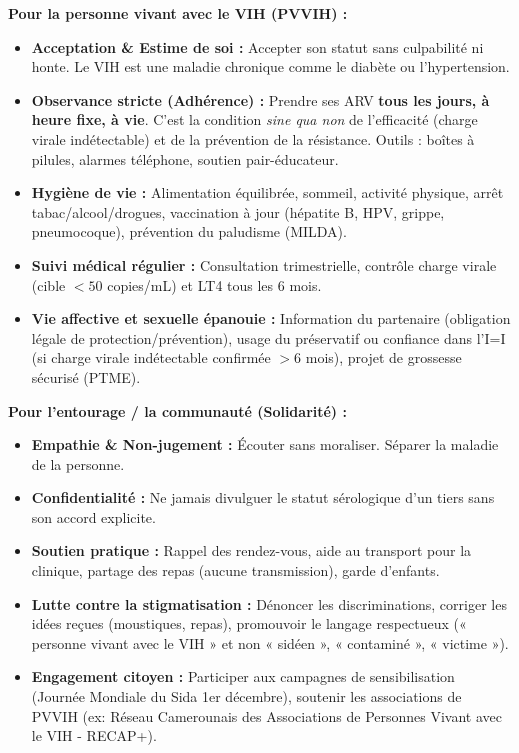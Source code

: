 \documentclass[11pt]{article}
\begin{document}
\begin{aretenir}
\textbf{Pour la personne vivant avec le VIH (PVVIH) :}
\begin{itemize}
    \item \textbf{Acceptation \& Estime de soi :} Accepter son statut sans culpabilité ni honte. Le VIH est une maladie chronique comme le diabète ou l'hypertension.
    \item \textbf{Observance stricte (Adhérence) :} Prendre ses ARV \textbf{tous les jours, à heure fixe, à vie}. C'est la condition \textit{sine qua non} de l'efficacité (charge virale indétectable) et de la prévention de la résistance. Outils : boîtes à pilules, alarmes téléphone, soutien pair-éducateur.
    \item \textbf{Hygiène de vie :} Alimentation équilibrée, sommeil, activité physique, arrêt tabac/alcool/drogues, vaccination à jour (hépatite B, HPV, grippe, pneumocoque), prévention du paludisme (MILDA).
    \item \textbf{Suivi médical régulier :} Consultation trimestrielle, contrôle charge virale (cible $< 50$ copies/mL) et LT4 tous les 6 mois.
    \item \textbf{Vie affective et sexuelle épanouie :} Information du partenaire (obligation légale de protection/prévention), usage du préservatif ou confiance dans l'I=I (si charge virale indétectable confirmée $> 6$ mois), projet de grossesse sécurisé (PTME).
\end{itemize}

\textbf{Pour l'entourage / la communauté (Solidarité) :}
\begin{itemize}
    \item \textbf{Empathie \& Non-jugement :} Écouter sans moraliser. Séparer la maladie de la personne.
    \item \textbf{Confidentialité :} Ne jamais divulguer le statut sérologique d'un tiers sans son accord explicite.
    \item \textbf{Soutien pratique :} Rappel des rendez-vous, aide au transport pour la clinique, partage des repas (aucune transmission), garde d'enfants.
    \item \textbf{Lutte contre la stigmatisation :} Dénoncer les discriminations, corriger les idées reçues (moustiques, repas), promouvoir le langage respectueux (« personne vivant avec le VIH » et non « sidéen », « contaminé », « victime »).
    \item \textbf{Engagement citoyen :} Participer aux campagnes de sensibilisation (Journée Mondiale du Sida 1er décembre), soutenir les associations de PVVIH (ex: Réseau Camerounais des Associations de Personnes Vivant avec le VIH - RECAP+).
\end{itemize}
\end{aretenir}
\end{document}

